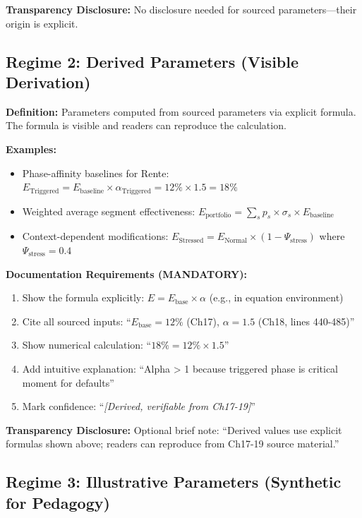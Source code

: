 \textbf{Transparency Disclosure:} No disclosure needed for sourced parameters---their origin is explicit.

\subsection{Regime 2: Derived Parameters (Visible Derivation)}
\label{subsec:jjj-derived}

\textbf{Definition:} Parameters computed from sourced parameters via explicit formula. The formula is visible and readers can reproduce the calculation.

\textbf{Examples:}
\begin{itemize}[nosep]
\item Phase-affinity baselines for Rente: $E_{\text{Triggered}} = E_{\text{baseline}} \times \alpha_{\text{Triggered}} = 12\% \times 1.5 = 18\%$
\item Weighted average segment effectiveness: $E_{\text{portfolio}} = \sum_s p_s \times \sigma_s \times E_{\text{baseline}}$
\item Context-dependent modifications: $E_{\text{Stressed}} = E_{\text{Normal}} \times (1 - \Psi_{\text{stress}})$ where $\Psi_{\text{stress}} = 0.4$
\end{itemize}

\textbf{Documentation Requirements (MANDATORY):}
\begin{enumerate}
\item Show the formula explicitly: $E = E_{\text{base}} \times \alpha$ (e.g., in equation environment)
\item Cite all sourced inputs: ``$E_{\text{base}} = 12\%$ (Ch17), $\alpha = 1.5$ (Ch18, lines 440-485)''
\item Show numerical calculation: ``$18\% = 12\% \times 1.5$''
\item Add intuitive explanation: ``Alpha > 1 because triggered phase is critical moment for defaults''
\item Mark confidence: ``\textit{[Derived, verifiable from Ch17-19]}''
\end{enumerate}

\textbf{Transparency Disclosure:} Optional brief note: ``Derived values use explicit formulas shown above; readers can reproduce from Ch17-19 source material.''

\subsection{Regime 3: Illustrative Parameters (Synthetic for Pedagogy)}
\label{subsec:jjj-illustrative}

